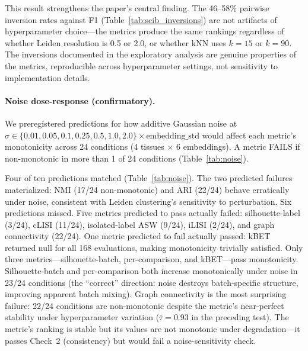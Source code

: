 \documentclass[9pt,lineno]{elife}
\begin{document}
This result strengthens the paper's central finding. The 46--58\% pairwise inversion rates against F1 (Table~\ref{tab:scib_inversions}) are not artifacts of hyperparameter choice---the metrics produce the same rankings regardless of whether Leiden resolution is 0.5 or 2.0, or whether kNN uses $k = 15$ or $k = 90$. The inversions documented in the exploratory analysis are genuine properties of the metrics, reproducible across hyperparameter settings, not sensitivity to implementation details.

\paragraph{Noise dose-response (confirmatory).} We preregistered predictions for how additive Gaussian noise at $\sigma \in \{0.01, 0.05, 0.1, 0.25, 0.5, 1.0, 2.0\} \times \text{embedding\_std}$ would affect each metric's monotonicity across 24 conditions (4 tissues $\times$ 6 embeddings). A metric FAILS if non-monotonic in more than 1 of 24 conditions (Table~\ref{tab:noise}).

Four of ten predictions matched (Table~\ref{tab:noise}). The two predicted failures materialized: NMI (17/24 non-monotonic) and ARI (22/24) behave erratically under noise, consistent with Leiden clustering's sensitivity to perturbation. Six predictions missed. Five metrics predicted to pass actually failed: silhouette-label (3/24), cLISI (11/24), isolated-label ASW (9/24), iLISI (2/24), and graph connectivity (22/24). One metric predicted to fail actually passed: kBET returned null for all 168 evaluations, making monotonicity trivially satisfied. Only three metrics---silhouette-batch, pcr-comparison, and kBET---pass monotonicity. Silhouette-batch and pcr-comparison both increase monotonically under noise in 23/24 conditions (the ``correct'' direction: noise destroys batch-specific structure, improving apparent batch mixing). Graph connectivity is the most surprising failure: 22/24 conditions are non-monotonic despite the metric's near-perfect stability under hyperparameter variation ($\bar{\tau} = 0.93$ in the preceding test). The metric's ranking is stable but its values are not monotonic under degradation---it passes Check~2 (consistency) but would fail a noise-sensitivity check.
\end{document}
